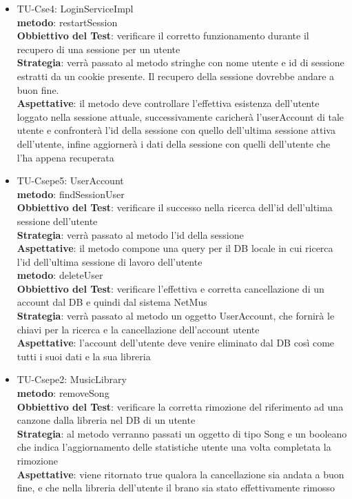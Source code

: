\begin{itemize}
\item TU-Cse4: LoginServiceImpl\\
\textbf{metodo}: restartSession\\
\textbf{Obbiettivo del Test}: verificare il corretto funzionamento durante il
recupero di una sessione per un utente\\
\textbf{Strategia}: verr\`a passato al metodo stringhe con nome utente e id
di sessione estratti da un cookie presente. Il recupero della sessione
dovrebbe andare a buon fine.\\
\textbf{Aspettative}: il metodo deve controllare l'effettiva esistenza
dell'utente loggato nella sessione attuale, successivamente caricher\`a
l'userAccount di tale utente e confronter\`a l'id della sessione con quello
dell'ultima sessione attiva dell'utente, infine aggiorner\`a i dati della
sessione con quelli dell'utente che l'ha appena recuperata\\

\item TU-Csepe5: UserAccount\\
\textbf{metodo}: findSessionUser\\
\textbf{Obbiettivo del Test}: verificare il successo nella ricerca dell'id
dell'ultima sessione dell'utente\\
\textbf{Strategia}: verr\`a passato al metodo
l'id della sessione\\
\textbf{Aspettative}: il metodo compone una query per il DB locale in cui
ricerca l'id dell'ultima sessione di lavoro dell'utente\\


\textbf{metodo}: deleteUser\\
\textbf{Obbiettivo del Test}: verificare l'effettiva e corretta cancellazione di un
account dal DB e quindi dal sistema NetMus\\
\textbf{Strategia}: verr\`a passato al metodo un oggetto UserAccount, che
fornir\`a le chiavi per la ricerca e la cancellazione dell'account utente\\
\textbf{Aspettative}: l'account dell'utente deve venire eliminato dal DB cos\`i come tutti i suoi dati e la sua libreria\\

\item TU-Csepe2: MusicLibrary\\
\textbf{metodo}: removeSong\\
\textbf{Obbiettivo del Test}: verificare la corretta rimozione del riferimento ad una
canzone dalla libreria nel DB di un utente\\
\textbf{Strategia}: al metodo verranno passati un oggetto di tipo Song e un
booleano che indica l'aggiornamento delle statistiche utente una volta
completata la rimozione\\
\textbf{Aspettative}: viene ritornato true qualora la
cancellazione sia andata a buon fine, e che nella libreria dell'utente il brano sia stato effettivamente rimosso\\


\end{itemize}
